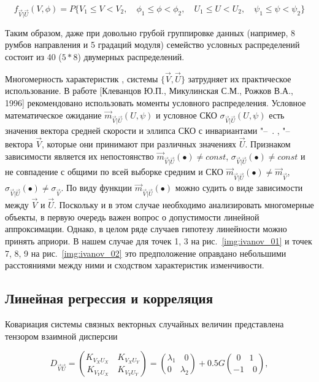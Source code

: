\begin{equation}
\label{eq:equation3_19}
{f_{\vec{V}|\vec{U}}}(V,\phi)=P\{V_{1}\le{V}<{V_2},\quad \phi_1\le\phi<{\phi_2}, \quad{U_1}\le{U}<{U_2},\quad \psi_1\le{\psi}<{\psi_2}\}
\end{equation}

Таким образом, даже при довольно грубой группировке данных (например, 8 румбов направления и 5 градаций модуля) семейство условных распределений состоит из 40 ($5 \ast 8$) двумерных распределений.

Многомерность характеристик , системы  $\{\vec{V},\vec{U}\}$ затрудняет их практическое использование. В работе [Клеванцов Ю.П., Микулинская С.М., Рожков В.А., 1996] рекомендовано использовать моменты условного распределения. Условное математическое ожидание ${\vec{m}_{\vec{V}|\vec{U}}}(U,\psi)$ и условное СКО ${\sigma_{\vec{V}|\vec{U}}}(U,\psi)$ есть значения вектора средней скорости  и эллипса СКО  с инвариантами "--~. , "--~ вектора $\vec{V}$, которые они принимают при различных значениях $\vec{U}$. Признаком зависимости является их непостоянство ${\vec{m}_{\vec{V}|\vec{U}}}(\bullet)\ne{const}$, ${\sigma_{\vec{V}|\vec{U}}}(\bullet)\ne{const}$ и не совпадение с общими по всей выборке средним и СКО ${\vec{m}_{\vec{V}|\vec{U}}}(\bullet)\ne{\vec{m}_{\vec{V}}}$, ${\sigma_{\vec{V}|\vec{U}}}(\bullet)\ne{\sigma_{\vec{V}}}$. По виду функции ${\vec{m}_{\vec{V}|\vec{U}}}(\bullet)$ можно судить о виде зависимости между $\vec{V}$ и $\vec{U}$. Поскольку и в этом случае необходимо  анализировать многомерные объекты, в первую очередь важен вопрос о допустимости линейной аппроксимации. Однако, в целом ряде случаев гипотезу линейности можно принять априори. В нашем случае для точек 1, 3 на рис.~\ref{img:ivanov_01} и точек 7, 8, 9 на рис.~\ref{img:ivanov_02} это предположение оправдано небольшими расстояниями между ними и сходством характеристик изменчивости.

\subsection{Линейная регрессия и корреляция}
Ковариация системы связных векторных случайных величин представлена тензором взаимной дисперсии

\begin{equation}
\label{eq:equation3_20}
D_{\vec{V}\vec{U}} = {K_{V_{X}U_{X}}\quad K_{V_{X}U_{Y}}\choose K_{V_{Y}U_{X}}\quad K_{V_{Y}U_{Y}}}={{{\lambda_{1}\quad 0}}\choose 0\quad {\lambda_{2}}} + 0.5G{{0}\quad {1}\choose {-1}\quad {0}},
\end{equation} 

